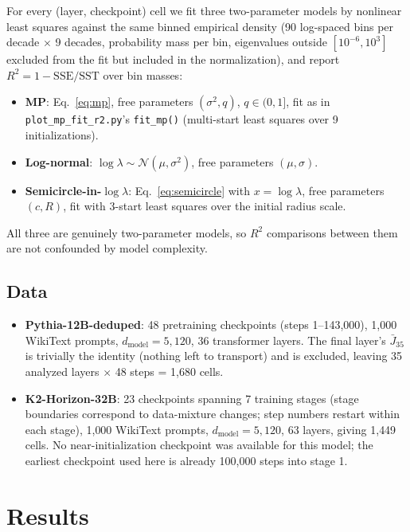\documentclass[11pt,a4paper]{article}
\begin{document}
For every (layer, checkpoint) cell we fit three two-parameter models by nonlinear least squares against the same binned empirical density (90 log-spaced bins per decade $\times$ 9 decades, probability mass per bin, eigenvalues outside $[10^{-6},10^{3}]$ excluded from the fit but included in the normalization), and report $R^2 = 1 - \mathrm{SSE}/\mathrm{SST}$ over bin masses:
\begin{itemize}
  \item \textbf{MP}: Eq.~\ref{eq:mp}, free parameters $(\sigma^2, q)$, $q\in(0,1]$, fit as in \texttt{plot\_mp\_fit\_r2.py}'s \texttt{fit\_mp()} (multi-start least squares over 9 initializations).
  \item \textbf{Log-normal}: $\log\lambda \sim \mathcal{N}(\mu,\sigma^2)$, free parameters $(\mu,\sigma)$.
  \item \textbf{Semicircle-in-$\log\lambda$}: Eq.~\ref{eq:semicircle} with $x = \log\lambda$, free parameters $(c, R)$, fit with 3-start least squares over the initial radius scale.
\end{itemize}
All three are genuinely two-parameter models, so $R^2$ comparisons between them are not confounded by model complexity.

\subsection{Data}

\begin{itemize}
  \item \textbf{Pythia-12B-deduped}: 48 pretraining checkpoints (steps 1--143{,}000), 1{,}000 WikiText prompts, $d_{\mathrm{model}}=5{,}120$, 36 transformer layers. The final layer's $\bar{J}_{35}$ is trivially the identity (nothing left to transport) and is excluded, leaving 35 analyzed layers $\times$ 48 steps = 1{,}680 cells.
  \item \textbf{K2-Horizon-32B}: 23 checkpoints spanning 7 training stages (stage boundaries correspond to data-mixture changes; step numbers restart within each stage), 1{,}000 WikiText prompts, $d_{\mathrm{model}}=5{,}120$, 63 layers, giving 1{,}449 cells. No near-initialization checkpoint was available for this model; the earliest checkpoint used here is already 100{,}000 steps into stage 1.
\end{itemize}

\section{Results}
\end{document}
